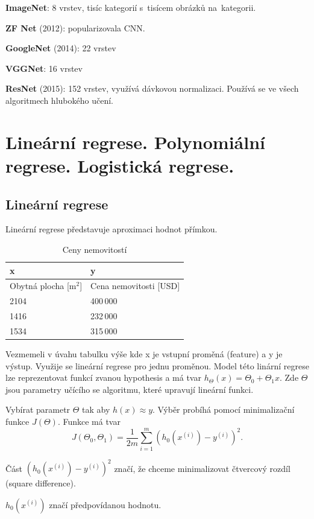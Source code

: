 \textbf{ImageNet}: 8 vrstev, tisíc kategorií s~tisícem obrázků na~kategorii.

\textbf{ZF Net} (2012): popularizovala CNN.

\textbf{GoogleNet} (2014): 22 vrstev

\textbf{VGGNet}: 16 vrstev

\textbf{ResNet} (2015): 152 vrstev, využívá dávkovou normalizaci. Používá se ve všech algoritmech hlubokého učení.

\clearpage
\section{Lineární regrese. Polynomiální regrese. Logistická regrese.}

\subsection{Lineární regrese}

Lineární regrese představuje aproximaci hodnot přímkou.

\begin{table}[h]
	\centering
	\begin{tabular}{ |p{4.5cm}||p{4.5cm}| }
	\hline
    x & y \\ \hline
    Obytná plocha [$\text{m}^2$] & Cena nemovitosti [USD]\\ \hline
    2104 & 400\,000 \\ \hline
    1416 & 232\,000 \\ \hline
    1534 & 315\,000 \\ \hline
	\end{tabular}
	\caption{Ceny nemovitostí}
\end{table}

Vezmemeli v úvahu tabulku výše kde x je vstupní proměná (feature) a y je výstup.
Využije se lineární regrese pro jednu proměnou.
Model této linární regrese lze reprezentovat funkcí zvanou hypothesis a má tvar $h_{\Theta}(x) = \Theta_0 + \Theta_1 x$.
Zde $\Theta$ jsou parametry učícího se algoritmu, které upravují lineární funkci.

Vybírat parametr $\Theta$ tak aby $h(x)\approx y$.
Výběr probíhá pomocí minimalizační funkce $J(\Theta)$.
Funkce má tvar 
\[
J(\Theta_0,\Theta_1) = \frac{1}{2m} \sum_{i=1}^{m}(h_0(x^{(i)})-y^{(i)})^2.
\]

Část $(h_0(x^{(i)})-y^{(i)})^2$ značí, že chceme minimalizovat čtvercový rozdíl (square difference).

$h_0(x^{(i)})$ značí předpovídanou hodnotu.

